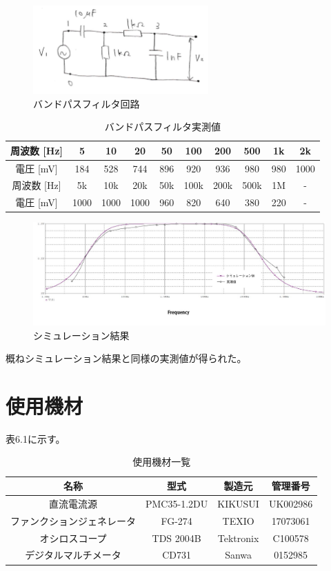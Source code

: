 \documentclass{jlreq}
\numberwithin{equation}{section}
\begin{document}
\begin{figure}[H]
  \centering
  \includegraphics[width=0.6\textwidth]{assets/bandpasskairo.png}
  \caption{バンドパスフィルタ回路}
\end{figure}

\begin{table}[H]
  \centering
    \caption{バンドパスフィルタ実測値}
    \begin{tabular}{|c|c|c|c|c|c|c|c|c|c|}
      \hline
      周波数 [Hz] & 5 & 10 & 20 & 50 & 100 & 200 & 500 & 1k & 2k \\ \hline
      電圧 [mV] & 184 & 528 & 744 & 896 & 920 & 936 & 980 & 980 & 1000 \\ \hline
      \hline
      周波数 [Hz] & 5k & 10k & 20k & 50k & 100k & 200k & 500k & 1M & - \\ \hline
      電圧 [mV] & 1000 & 1000 & 1000 & 960 & 820 & 640 & 380 & 220 & - \\ \hline
    \end{tabular}
\end{table}

\begin{figure}[H]
  \centering
  \includegraphics[width=\textwidth]{assets/bandpass.jpg}
  \caption{シミュレーション結果}
\end{figure}

概ねシミュレーション結果と同様の実測値が得られた。

\section{使用機材}
表6.1に示す。
\begin{table}[H]
  \centering
  \caption{使用機材一覧}
  \begin{tabular}{|c|c|c|c|}
    \hline
    名称 & 型式 & 製造元 & 管理番号 \\ \hline
    直流電流源 & PMC35-1.2DU & KIKUSUI & UK002986 \\ \hline
    ファンクションジェネレータ & FG-274 & TEXIO & 17073061 \\ \hline
    オシロスコープ & TDS 2004B & Tektronix & C100578 \\ \hline
    デジタルマルチメータ & CD731 & Sanwa & 0152985 \\ \hline
  \end{tabular}
\end{table}
\end{document}
